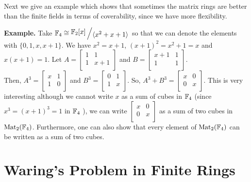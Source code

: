 \documentclass[11pt,reqno]{amsart}
\newcommand{\bigslant}[2]{{\raisebox{.2em}{$#1$}\left/\raisebox{-.2em}{$#2$}\right.}}
\begin{document}
Next we give an example which shows that sometimes the matrix rings are better than the finite fields in terms of coverability, since we have more flexibility.

\textbf{Example.} Take $\Bbb F_4 \cong \bigslant{\Bbb F_2[x]}{\langle x^2+x+1 \rangle} $ so that we can denote the elements with $\{0,1,x,x+1\}$. We have $x^2=x+1$, $(x+1)^2=x^2 + 1 = x$ and $x(x+1)=1$. Let $A=                   
\begin{bmatrix}
		1 & 1 \\
		1 & x+1 \\
\end{bmatrix}$ and $B=
\begin{bmatrix}
x+1 & 1 \\
1 & 1 \\
\end{bmatrix}.$ \\
Then, $A^3=
\begin{bmatrix}
	x & 1 \\
	1 & 0 \\
	\end{bmatrix}$ and $B^3=
\begin{bmatrix}
0 & 1 \\
1 & x \\
\end{bmatrix}$. So, $A^3+B^3=
\begin{bmatrix}
	x & 0 \\
	0 & x \\
	\end{bmatrix}.$ This is very interesting although we cannot write $x$ as a sum of cubes in $\Bbb F_4$ (since $x^3= (x+1)^3 = 1$ in $\Bbb F_4$ ), we can write $ \begin{bmatrix}
	x & 0 \\
	0 & x \\
\end{bmatrix}$ as a sum of two cubes in $\operatorname{Mat}_2 (\Bbb F_4)$. Furthermore, one can also show that every element of $\operatorname{Mat}_2 (\Bbb F_4)$ can be written as a sum of two cubes. 

\section{Waring's Problem in Finite Rings}\label{WP in Finite Rings}
\end{document}
